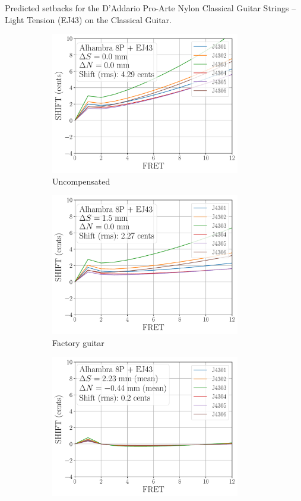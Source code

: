  \begin{table}[htbp]
  \centering
  \caption{\label{tbl:ej43_setbacks} Predicted setbacks for the D'Addario Pro-Arte Nylon Classical Guitar Strings -- Light Tension (EJ43) on the Classical Guitar.}
  
 \end{table}%

 \begin{figure}
  \centering
  \begin{subfigure}[b]{0.45\textwidth}
   \centering
   \includegraphics[width=3.25in]{../figures/shift_alhambra8p_ej43_null}
   \caption{Uncompensated}
   \label{fig:shift_alhambra8p_ej43_null}
  \end{subfigure}
  \hspace{0.25in}
  \begin{subfigure}[b]{0.45\textwidth}
   \centering
   \includegraphics[width=3.25in]{../figures/shift_alhambra8p_ej43_factory}
   \caption{Factory guitar}
   \label{fig:shift_alhambra8p_ej43_factory}
  \end{subfigure}
  \par\vspace{0.25in}
  \begin{subfigure}[b]{0.45\textwidth}
   \centering
   \includegraphics[width=3.25in]{../figures/shift_alhambra8p_ej43_full}

\end{subfigure}
\end{figure}
